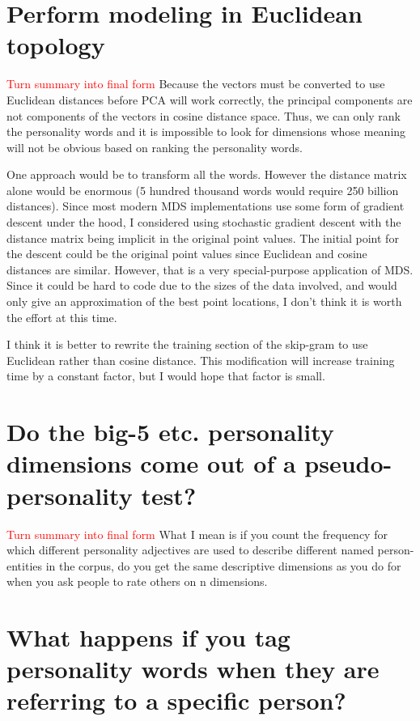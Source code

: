\documentclass[10pt,letterpaper]{book}
\newcommand{\todo}[1]{\textcolor{red}{#1}}
\begin{document}
\section{Perform modeling in Euclidean topology}

\todo{Turn summary into final form}
Because the vectors must be converted to use Euclidean distances before PCA will work correctly, the principal components are not components of the vectors in cosine distance space. Thus, we can only rank the personality words and it is impossible to look for dimensions whose meaning will not be obvious based on ranking the personality words.

One approach would be to transform all the words. However the distance matrix alone would be enormous (5 hundred thousand words would require 250 billion distances). Since most modern MDS implementations use some form of gradient descent under the hood, I considered using stochastic gradient descent with the distance matrix being implicit in the original point values. The initial point for the descent could be the original point values since Euclidean and cosine distances are similar. However, that is a very special-purpose application of MDS. Since it could be hard to code due to the sizes of the data involved, and would only give an approximation of the best point locations, I don't think it is worth the effort at this time.

I think it is better to rewrite the training section of the skip-gram to use Euclidean rather than cosine distance. This modification will increase training time by a constant factor, but I would hope that factor is small.

\section{Do the big-5 etc. personality dimensions come out of a pseudo-personality test?}
\todo{Turn summary into final form}
What I mean is if you count the frequency for which different personality adjectives are used to describe different named person-entities in the corpus, do you get the same descriptive dimensions as you do for when you ask people to rate others on n dimensions.

\section{What happens if you tag personality words when they are referring to a specific person?}
\end{document}
